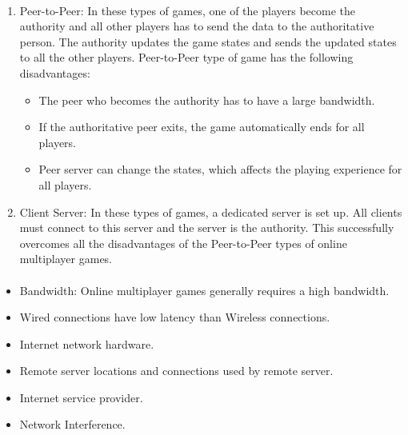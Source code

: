\documentclass[oneside,12pt]{Classes/VTU}
\begin{document}
			\paragraph{}
			\begin{enumerate}
				\item Peer-to-Peer: In these types of games, one of the players become the authority and all other players has to send the data to the authoritative person. The authority updates the game states and sends the updated states to all the other players. Peer-to-Peer type of game has the following disadvantages:
				\begin{itemize}
					\item The peer who becomes the authority has to have a large bandwidth.
					\item If the authoritative peer exits, the game automatically ends for all players. 
					\item Peer server can change the states, which affects the playing experience for all players.
				\end{itemize}
				\item Client Server: In these types of games, a dedicated server is set up. All clients must connect to this server and the server is the authority. This successfully overcomes all the disadvantages of the Peer-to-Peer types of online multiplayer games. 
			\end{enumerate}
			
			\paragraph{}
			\begin{itemize}
				\item Bandwidth: Online multiplayer games generally requires a high bandwidth.
				\item Wired connections have low latency than Wireless connections. 
				\item Internet network hardware.
				\item Remote server locations and connections used by remote server.
				\item Internet service provider. 
				\item Network Interference. 
			\end{itemize}
			
\end{document}
